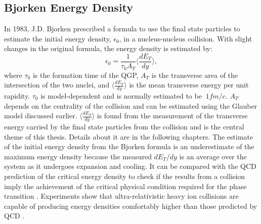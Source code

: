\subsection{Bjorken Energy Density}
In 1983, J.D. Bjorken\cite{PhysRevD.27.140} prescribed a formula to use the final state particles to estimate the initial energy density, $\epsilon_{0}$, in a nucleus-nucleus collision. With slight changes in the original formula, the energy density is estimated by:
	\begin{equation}\label{eqn:bjorken}
	\epsilon_{0} = \frac{1}{\tau_{0}A_{T}}\langle\frac{dE_{T}}{dy}\rangle,
	\end{equation}
where $\tau_{0}$ is the formation time of the QGP, $A_{T}$ is the transverse area of the intersection of the two nuclei, and $\langle\frac{dE_{T}}{dy}\rangle$ is the mean transverse energy per unit rapidity. $\tau_{0}$ is model-dependent and is normally estimated to be $~1 fm/c$. $A_{T}$ depends on the centrality of the collision and can be estimated using the Glauber model discussed earlier. $\langle\frac{dE_{T}}{dy}\rangle$ is found from the measurement of the transverse energy carried by the final state particles from the collision and is the central theme of this thesis. Details about it are in the following chapters.
The estimate of the initial energy density from the Bjorken formula is an underestimate of the maximum energy density because the measured $dE_{T}/dy$ is an average over the system as it undergoes expansion and cooling. It can be compared with the QCD prediction of the critical energy density \cite{Adam:2139456} to check if the results from a collision imply the achievement of the critical physical condition required for the phase transition \cite{2005PrPNP..54..443J}. Experiments show that ultra-relativistic heavy ion collisions are capable of producing energy densities comfortably higher than those predicted by QCD \cite{Adam:2139456}.

